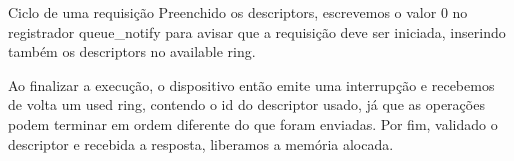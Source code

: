 \documentclass[brazil,nolapesd,aspectratio=169,noartschool]{lapesd-slides}
\begin{document}
\begin{frame}{Ciclo de uma requisição}
Preenchido os descriptors, escrevemos o valor 0 no registrador queue{\_}notify para avisar que a requisição deve ser iniciada,
inserindo também os descriptors no available ring.


Ao finalizar a execução, o dispositivo então emite uma interrupção e recebemos de volta um used ring, contendo o id do descriptor usado,
já que as operações podem terminar em ordem diferente do que foram enviadas. Por fim, validado o descriptor e recebida a resposta, liberamos a memória alocada.
\end{frame}


\thanksframe

\end{document}

